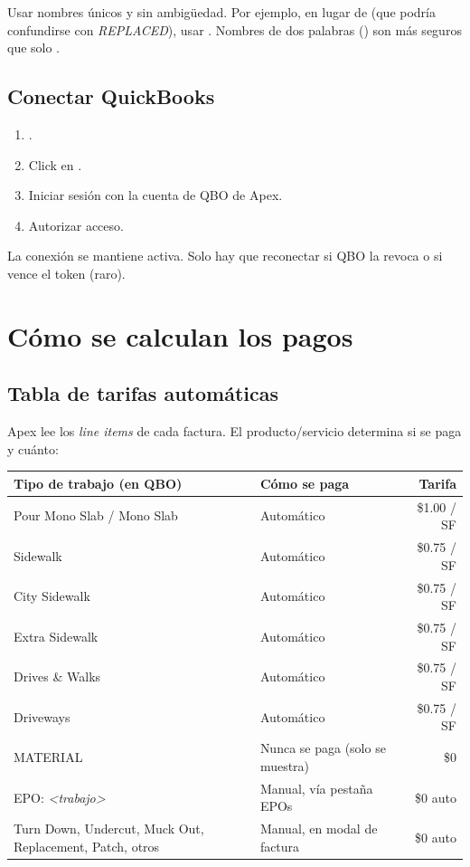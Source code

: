 \documentclass[11pt,a4paper]{article}
\begin{document}
\begin{tipbox}
Usar nombres únicos y sin ambigüedad. Por ejemplo, en lugar de  (que podría confundirse con \textit{REPLACED}), usar . Nombres de dos palabras () son más seguros que solo .
\end{tipbox}

\subsection{Conectar QuickBooks}

\begin{enumerate}
  \item {}.
  \item Click en .
  \item Iniciar sesión con la cuenta de QBO de Apex.
  \item Autorizar acceso.
\end{enumerate}

La conexión se mantiene activa. Solo hay que reconectar si QBO la revoca o si vence el token (raro).

\section{Cómo se calculan los pagos}

\subsection{Tabla de tarifas automáticas}

Apex lee los \textit{line items} de cada factura. El producto/servicio determina si se paga y cuánto:

\begin{center}
\begin{tabularx}{\linewidth}{L{4.5cm} X r}
\toprule
\textbf{Tipo de trabajo (en QBO)} & \textbf{Cómo se paga} & \textbf{Tarifa} \\
\midrule
Pour Mono Slab / Mono Slab & Automático & \$1.00 / SF \\
Sidewalk                   & Automático & \$0.75 / SF \\
City Sidewalk              & Automático & \$0.75 / SF \\
Extra Sidewalk             & Automático & \$0.75 / SF \\
Drives \& Walks            & Automático & \$0.75 / SF \\
Driveways                  & Automático & \$0.75 / SF \\
\midrule
MATERIAL                   & Nunca se paga (solo se muestra) & \$0 \\
EPO: \textit{<trabajo>}    & Manual, vía pestaña EPOs & \$0 auto \\
Turn Down, Undercut, Muck Out, Replacement, Patch, otros & Manual, en modal de factura & \$0 auto \\
\bottomrule
\end{tabularx}
\end{center}
\end{document}
